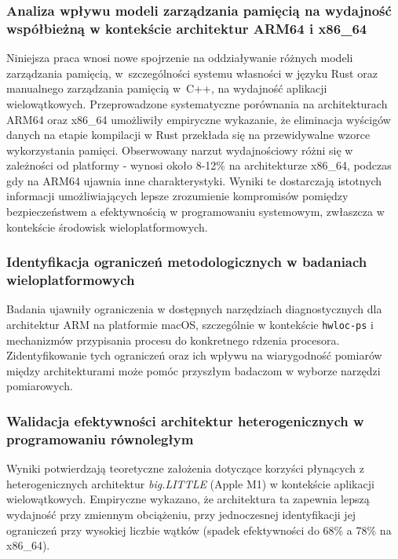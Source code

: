 \subsubsection{Analiza wpływu modeli zarządzania pamięcią na wydajność współbieżną w kontekście architektur ARM64 i x86\_64}

Niniejsza praca wnosi nowe spojrzenie na oddziaływanie różnych modeli zarządzania pamięcią, w~szczególności systemu własności w języku Rust oraz manualnego zarządzania pamięcią w~C++, na wydajność aplikacji wielowątkowych. Przeprowadzone systematyczne porównania na architekturach ARM64 oraz x86\_64 umożliwiły empiryczne wykazanie, że eliminacja wyścigów danych na etapie kompilacji w Rust przekłada się na przewidywalne wzorce wykorzystania pamięci. Obserwowany narzut wydajnościowy różni się w zależności od platformy - wynosi około 8-12\% na architekturze x86\_64, podczas gdy na ARM64 ujawnia inne charakterystyki. Wyniki te dostarczają istotnych informacji umożliwiających lepsze zrozumienie kompromisów pomiędzy bezpieczeństwem a efektywnością w programowaniu systemowym, zwłaszcza w kontekście środowisk wieloplatformowych.

\subsubsection{Identyfikacja ograniczeń metodologicznych w badaniach wieloplatformowych}

Badania ujawniły ograniczenia w dostępnych narzędziach diagnostycznych dla architektur ARM na platformie macOS, szczególnie w kontekście \texttt{hwloc-ps} i mechanizmów przypisania procesu do konkretnego rdzenia procesora. Zidentyfikowanie tych ograniczeń oraz ich wpływu na wiarygodność pomiarów między architekturami może pomóc przyszłym badaczom w wyborze narzędzi pomiarowych.

\subsubsection{Walidacja efektywności architektur heterogenicznych w programowaniu równoległym}

Wyniki potwierdzają teoretyczne założenia dotyczące korzyści płynących z heterogenicznych architektur \emph{big.LITTLE} (Apple M1) w kontekście aplikacji wielowątkowych. Empiryczne wykazano, że architektura ta zapewnia lepszą wydajność przy zmiennym obciążeniu, przy jednoczesnej identyfikacji jej ograniczeń przy wysokiej liczbie wątków (spadek efektywności do 68\% a 78\% na x86\_64).

